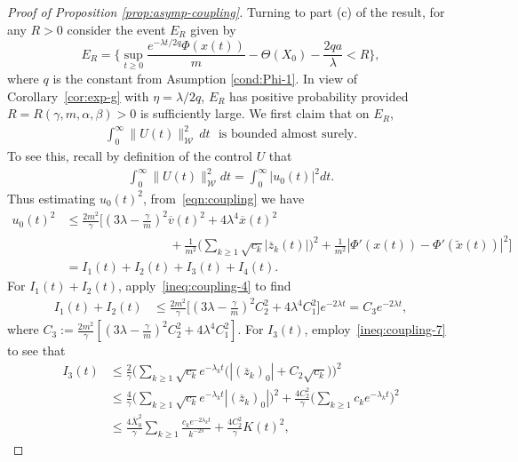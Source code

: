 \documentclass[11pt]{amsart}
\theoremstyle{definition}
\newcommand{\W}{\mathcal{W}}
\newcommand{\Xbar}{\overline{X}}
\newcommand{\xbar}{\overline{x}}
\newcommand{\vbar}{\overline{v}}
\newcommand{\zbar}{\overline{z}}
\theoremstyle{definition}
\theoremstyle{plain}
\numberwithin{equation}{section}
\begin{document}
\begin{proof}[Proof of Proposition \ref{prop:asymp-coupling}]
Turning to part (c) of the result, for any $R>0$ consider the event $E_R$ given by 
\begin{equation} \label{eqn:coupling-9}
E_{R}=\Big\{\sup_{t\geq 0}\frac{e^{-\lambda t/2q}\Phi(x(t))}{m}-\Theta(X_0)-\frac{2qa}{\lambda}< R\Big\},
\end{equation}
where $q$ is the constant from Asumption \ref{cond:Phi-1}. In view of Corollary~\ref{cor:exp-g} with $\eta=\lambda/2q$, $E_{R}$ has positive probability provided $R=R(\gamma,m,\alpha,\beta)>0$ is  sufficiently large. We first claim that on $E_R$, 
\begin{align*}
\int_0^\infty \|U(t)\|_{\W}^2 \, dt \,\,  \text{ is bounded almost surely}.
\end{align*}
To see this, recall by definition of the control $U$ that 
\begin{align*}
\int_0^\infty \|U(t)\|_{\W}^2dt=\int_0^\infty |u_0(t)|^2dt. 
\end{align*}
Thus estimating $u_0(t)^2$, from~\eqref{eqn:coupling} we have 
\begin{equation*}
\begin{aligned}
u_0(t)^2&\leq \frac{2 m^2}{\gamma} \Big[\left(3\lambda-\frac{\gamma}{m}\right)^2\vbar(t)^2+4\lambda^4\xbar(t)^2\\
&\qquad\qquad\qquad\qquad\,\,+\frac{1}{m^2}\Big(\sum_{k\geq 1}\sqrt{c_k}|\zbar_k(t)|\Big)^2+\frac{1}{m^2}\left|\Phi'(x(t))-\Phi'(\widetilde{x}(t))\right|^2\Big]\\
&= I_1(t)+I_2(t)+I_3(t)+I_4(t).
\end{aligned}
\end{equation*}
For $I_1(t)+I_2(t)$, apply~\eqref{ineq:coupling-4} to find
\begin{align}\label{ineq:coupling-11}
I_1(t)+I_2(t) &\leq \frac{2m^2}{\gamma}  \Big[\left(3\lambda-\frac{\gamma}{m}\right)^2C_2^2+4\lambda^4C_1^2\Big]e^{-2\lambda t}=C_3 e^{-2\lambda t},
\end{align}
where $C_3:= \frac{2m^2}{\gamma}  \left[\left(3\lambda-\frac{\gamma}{m}\right)^2C_2^2+4\lambda^4C_1^2\right]$. For $I_3(t)$, employ~\eqref{ineq:coupling-7} to see that  
\begin{align*}
I_3(t)&\leq \frac{2}{\gamma} \Big(\sum_{k\geq 1}\sqrt{c_k}e^{-\lambda_k t}\big(|(\zbar_k)_0| +C_2\sqrt{c_k}\big)\Big)^2\\&\leq \frac{4}{\gamma}\Big(\sum_{k\geq 1}\sqrt{c_k}e^{-\lambda_k t}|(\zbar_k)_0|\Big)^2+\frac{4C_2^2}{\gamma}\Big( \sum_{k\geq 1}c_ke^{-\lambda_k t}\Big)^2\\
&\leq \frac{4\Xbar_0^2}{\gamma}\sum_{k\geq 1}\frac{c_k e^{-2\lambda_k t}}{k^{-2s}}+\frac{4C_2^2}{\gamma}K(t)^2,

\end{align*}
\end{proof}
\end{document}
